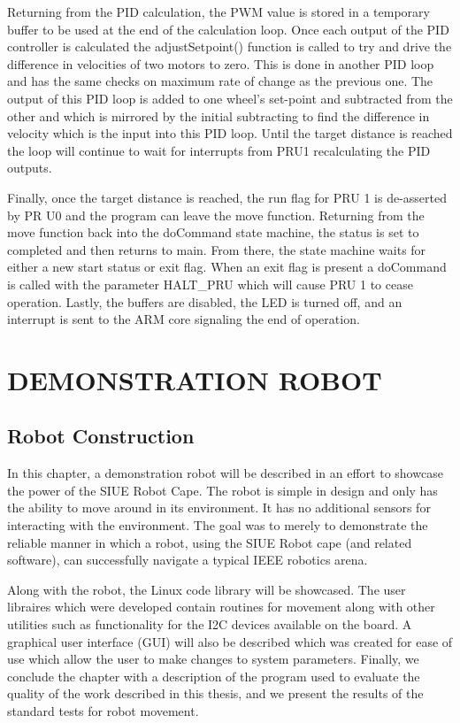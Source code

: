 \documentclass[12pt,oneside,final]{siuethesis}
\theoremstyle{definition}
\begin{document}
Returning from the PID calculation, the PWM value is stored in a temporary buffer to be used at the end of the calculation loop. Once each output of the PID controller is calculated the adjustSetpoint() function is called to try and drive the difference in velocities of two motors to zero. This is done in another PID loop and has the same checks on maximum rate of change as the previous one. The output of this PID loop is added to one wheel's set-point and subtracted from the other and which is mirrored by the initial subtracting to find the difference in velocity which is the input into this PID loop. Until the target distance is reached the loop will continue to wait for interrupts from PRU1 recalculating the PID outputs. 

Finally, once the target distance is reached, the run flag for PRU 1 is de-asserted by PR U0 and the program can leave the move function. Returning from the move function back into the doCommand state machine, the status is set to completed and then returns to main. From there, the state machine waits for either a new start status or exit flag. When an exit flag is present a doCommand is called with the parameter HALT\_PRU which will cause PRU 1 to cease operation.  Lastly, the buffers are disabled, the LED is turned off, and an interrupt is sent to the ARM core signaling the end of operation.

\chapter{DEMONSTRATION ROBOT}

\section{Robot Construction}

In this chapter, a demonstration robot will be described in an effort to showcase the power of the SIUE Robot Cape. The robot is simple in design and only has the ability to move around in its environment. It has no additional sensors for interacting with the environment. The goal was to merely to demonstrate the reliable manner in which a robot, using the SIUE Robot cape (and related software), can successfully navigate a typical IEEE robotics arena. 

Along with the robot, the Linux code library will be showcased.  The user libraires which were developed contain routines for movement along with other utilities such as functionality for the I2C devices available on the board. A graphical user interface (GUI) will also be described which was created for ease of use which allow the user to make changes to system parameters. Finally, we conclude the chapter with a description of the program used to evaluate the quality of the work described in this thesis, and we present the results of the standard tests for robot movement.
\end{document}
